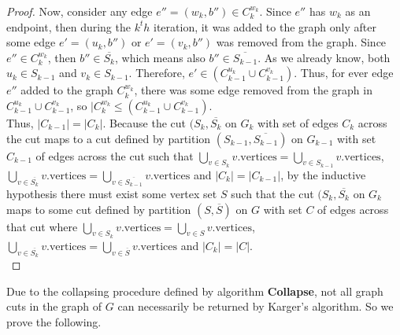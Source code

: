\documentclass[psamsfonts, 10pt]{amsart}
\theoremstyle{definition}
\theoremstyle{remark}
\numberwithin{equation}{section}
\newcommand{\tor}{\text{ or } }
\begin{document}
\begin{proof}
Now, consider any edge $e'' = (w_k, b'') \in C_k^{w_k}$. Since $e''$ has $w_k$ as an endpoint, then during the $k^th$ iteration, it was added to the graph only after some edge $e' = (u_k, b'') \tor e' = (v_k, b'')$ was removed from the graph. Since $e'' \in C_k^{w_k}$, then $b'' \in \overline{S_k}$, which means also $b'' \in \overline{S_{k-1}}$. As we already know, both $u_k \in S_{k-1}$ and $v_k \in S_{k-1}$. Therefore,  $e' \in (C_{k-1}^{u_k} \cup C_{k-1}^{v_k})$. Thus, for ever edge $e''$ added to the graph $C_k^{w_k}$, there was some edge removed from the graph in $C_{k-1}^{u_k} \cup C_{k-1}^{v_k}$, so $\lvert C_k^{w_k} \leq (C_{k-1}^{u_k} \cup C_{k-1}^{v_k})$.\\

Thus, $\lvert C_{k-1} \rvert = \lvert C_k \rvert$. Because the cut $(S_k, \overline{S_k}$ on $G_k$ with set of edges $C_k$ across the cut maps to a cut defined by partition $(S_{k-1}, \overline{S_{k-1}})$ on $G_{k-1}$ with set $C_{k-1}$ of edges across the cut such that $\bigcup_{v \in S_k} v.\text{vertices} = \bigcup_{v \in S_{k-1}} v.\text{vertices}$, $\bigcup_{v \in \overline{S_k}} v.\text{vertices} = \bigcup_{v \in \overline{S_{k-1}}} v.\text{vertices}$ and $\lvert C_k \rvert = \lvert C_{k-1} \rvert$, by the inductive hypothesis there must exist some vertex set $S$ such that the cut $(S_k, \overline{S_k}$ on $G_k$ maps to some cut defined by partition $(S, \overline{S})$ on $G$ with set $C$ of edges across that cut where $\bigcup_{v \in S_k} v.\text{vertices} = \bigcup_{v \in S} v.\text{vertices}$, $\bigcup_{v \in \overline{S_k}} v.\text{vertices} = \bigcup_{v \in \overline{S}} v.\text{vertices}$ and $\lvert C_k \rvert = \lvert C \rvert$.\\
\end{proof}


Due to the collapsing procedure defined by algorithm {\bf Collapse}, not all graph cuts in the graph of $G$ can necessarily be returned by Karger's algorithm. So we prove the following.
\end{document}
